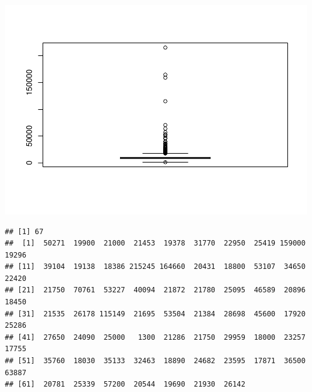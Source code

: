 \documentclass[]{article}
\newenvironment{Shaded}{\begin{snugshade}}{\end{snugshade}}
\newcommand{\KeywordTok}[1]{\textcolor[rgb]{0.13,0.29,0.53}{\textbf{#1}}}
\newcommand{\DecValTok}[1]{\textcolor[rgb]{0.00,0.00,0.81}{#1}}
\newcommand{\StringTok}[1]{\textcolor[rgb]{0.31,0.60,0.02}{#1}}
\newcommand{\ControlFlowTok}[1]{\textcolor[rgb]{0.13,0.29,0.53}{\textbf{#1}}}
\newcommand{\OperatorTok}[1]{\textcolor[rgb]{0.81,0.36,0.00}{\textbf{#1}}}
\newcommand{\NormalTok}[1]{#1}
\begin{document}
\begin{Shaded}
\end{Shaded}

\includegraphics{EDA_files/figure-latex/unnamed-chunk-27-1.pdf}

\begin{verbatim}
## [1] 67
##  [1]  50271  19900  21000  21453  19378  31770  22950  25419 159000  19296
## [11]  39104  19138  18386 215245 164660  20431  18800  53107  34650  22420
## [21]  21750  70761  53227  40094  21872  21780  25095  46589  20896  18450
## [31]  21535  26178 115149  21695  53504  21384  28698  45600  17920  25286
## [41]  27650  24090  25000   1300  21286  21750  29959  18000  23257  17755
## [51]  35760  18030  35133  32463  18890  24682  23595  17871  36500  63887
## [61]  20781  25339  57200  20544  19690  21930  26142
\end{verbatim}
\end{document}
